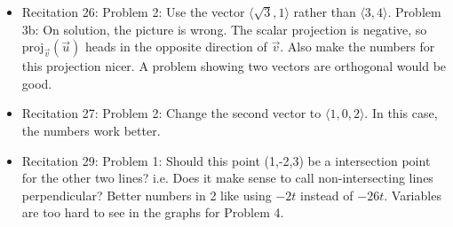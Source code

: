 \documentclass{article}
\begin{document}
\begin{itemize}
\item Recitation 26: Problem 2: Use the vector $\langle \sqrt{3}, 1 \rangle$ rather than $\langle 3, 4 \rangle$. Problem 3b: On solution, the picture is wrong. The scalar projection is negative, so $\text{proj}_{\vec{v}}(\vec{u})$ heads in the opposite direction of $\vec{v}$. Also make the numbers for this projection nicer. A problem showing two vectors are orthogonal would be good.
\item Recitation 27: Problem 2: Change the second vector to $\langle 1, 0, 2 \rangle$. In this case, the numbers work better. 
\item Recitation 29: Problem 1: Should this point (1,-2,3) be a intersection point for the other two lines? i.e. Does it make sense to call non-intersecting lines perpendicular? Better numbers in 2 like using $-2t$ instead of $-26t$. Variables are too hard to see in the graphs for Problem 4. 
\end{itemize}
\end{document}
